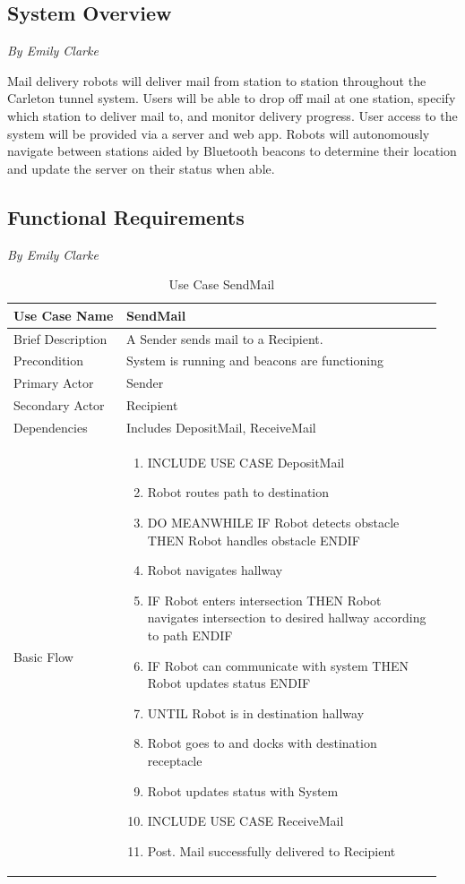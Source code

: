 \documentclass[12pt]{report}
\newcommand{\sectionAuthor}[1]{{\small\vspace{-1em}\textit{#1}}\bigskip\par}
\newcommand\tabularhead[1]{
    \begin{table}[H]
      \caption{Use Case #1}
      \begin{tabular}{|p{0.25\linewidth}|p{0.7\linewidth}|}
        \hline
        \textbf{Use Case Name} & \textbf{#1} \\
        \hline}
\newcommand\addrow[2]{#1 &#2\\ \hline}
\newcommand\addmulrow[2]{ \begin{minipage}[t][][t]{4cm}\raggedright#1\end{minipage} 
         &\begin{minipage}[t][][t]{10cm}
          \begin{enumerate} #2   \end{enumerate}
          \end{minipage} \vspace{0.1cm} \\ \hline}
\newenvironment{usecase}{\tabularhead}
    {\end{tabular}\end{table}}
\begin{document}
\subsection{System Overview}
\sectionAuthor{By Emily Clarke}
Mail delivery robots will deliver mail from station to station throughout the Carleton tunnel system. Users will be able to drop off mail at one station, specify which station to deliver mail to, and monitor delivery progress. User access to the system will be provided via a server and web app. Robots will autonomously navigate between stations aided by Bluetooth beacons to determine their location and update the server on their status when able.
\subsection{Functional Requirements}
\sectionAuthor{By Emily Clarke}

\begin{usecase}{SendMail}
    \addrow{Brief Description}{A Sender sends mail to a Recipient.}
    \addrow{Precondition}{System is running and beacons are functioning}
    \addrow{Primary Actor}{Sender}
    \addrow{Secondary Actor}{Recipient}
    \addrow{Dependencies}{Includes DepositMail, ReceiveMail}
    \addmulrow{Basic Flow}{
        \item INCLUDE USE CASE DepositMail
        \item Robot routes path to destination
        \item DO MEANWHILE IF Robot detects obstacle THEN Robot handles obstacle ENDIF
        \item Robot navigates hallway
        \item IF Robot enters intersection THEN Robot navigates intersection to desired hallway according to path ENDIF
        \item IF Robot can communicate with system THEN Robot updates status ENDIF
        \item UNTIL Robot is in destination hallway
        \item Robot goes to and docks with destination receptacle
        \item Robot updates status with System
        \item INCLUDE USE CASE ReceiveMail
        \item[Post.] Mail successfully delivered to Recipient
    }
\end{usecase}
\end{document}
